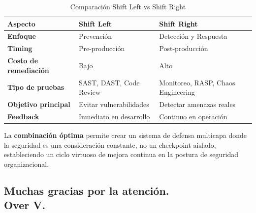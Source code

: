 {\begin{table}[h]
\centering
\caption{Comparación Shift Left vs Shift Right}
\begin{tabular}{|l|l|l|}
\hline
\textbf{Aspecto} & \textbf{Shift Left} & \textbf{Shift Right} \\
\hline
\textbf{Enfoque} & Prevención & Detección y Respuesta \\
\hline
\textbf{Timing} & Pre-producción & Post-producción \\
\hline
\textbf{Costo de remediación} & Bajo & Alto \\
\hline
\textbf{Tipo de pruebas} & SAST, DAST, Code Review & Monitoreo, RASP, Chaos Engineering \\
\hline
\textbf{Objetivo principal} & Evitar vulnerabilidades & Detectar amenazas reales \\
\hline
\textbf{Feedback} & Inmediato en desarrollo & Continuo en operación \\
\hline
\end{tabular}
\end{table}

La \textbf{combinación óptima} permite crear un sistema de defensa multicapa donde la seguridad es una consideración constante, no un checkpoint aislado, estableciendo un ciclo virtuoso de mejora continua en la postura de seguridad organizacional.









\subsection*{Muchas gracias por la atención.\\Over V.}

}